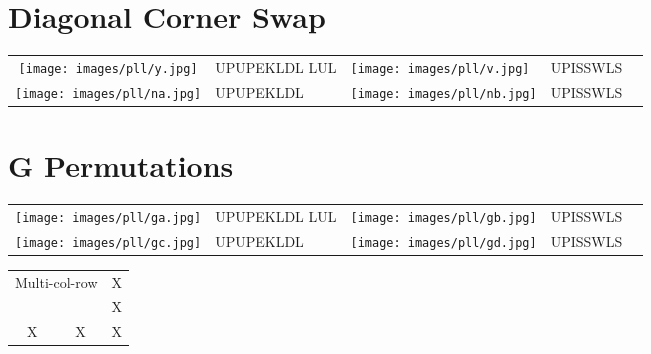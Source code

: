 \documentclass{article}
\begin{document}
\begin{multicols}{2}
        \section*{Diagonal Corner Swap}
        \begin{tabular}{|c|ll|c|l} %
            \centering
            \texttt{[image: images/pll/y.jpg]} & UPUPEKLDL LUL & \texttt{[image: images/pll/v.jpg]} & UPISSWLS\\
            \texttt{[image: images/pll/na.jpg]} & UPUPEKLDL & \texttt{[image: images/pll/nb.jpg]} & UPISSWLS\\
        \end{tabular}

        \section*{G Permutations}
        \begin{tabular}{|c|ll|c|l} %
            \centering
            \texttt{[image: images/pll/ga.jpg]} & UPUPEKLDL LUL & \texttt{[image: images/pll/gb.jpg]} & UPISSWLS\\
            \texttt{[image: images/pll/gc.jpg]} & UPUPEKLDL & \texttt{[image: images/pll/gd.jpg]} & UPISSWLS\\
        \end{tabular}


        \columnbreak

        \begin{tabular}{ccc}
            \hline
            \multicolumn{2}{c}{\multirow{2}{*}{Multi-col-row}}&X\\
            \multicolumn{2}{c}{}&X\\
            \hline
            X&X&X\\
            \hline
        \end{tabular}


        \blindtext[2]

    \end{multicols}
\end{document}
